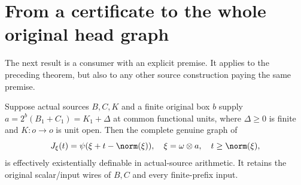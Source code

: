 \section{From a certificate to the whole original head graph}\label{sec:head-graph}

The next result is a consumer with an explicit premise.  It applies to
the preceding theorem, but also to any other source construction paying
the same premise.

\begin{theorem}\label{thm:head-graph}
Suppose actual sources $B,C,K$ and a finite original box $b$ supply
$a=2^b(B_1+C_1)=K_1+\Delta$ at common functional units, where
$\Delta\ge0$ is finite and $K:o\to o$ is unit open.  Then the complete
genuine graph of
\[
 J_\xi(t)=\psi(\xi+t-\norm(\xi)),\quad
 \xi=\omega\otimes a,\quad t\ge\norm(\xi),
\]
is effectively existentially definable in actual-source arithmetic.  It
retains the original scalar/input wires of $B,C$ and every finite-prefix input.
\end{theorem}
